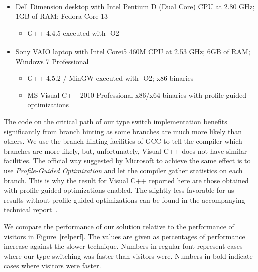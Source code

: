 \begin{itemize}
\setlength{\itemsep}{0pt}
\setlength{\parskip}{0pt}
\item Dell Dimension\textsuperscript{\textregistered} desktop with Intel\textsuperscript{\textregistered} Pentium\textsuperscript{\textregistered} 
      D (Dual Core) CPU at 2.80 GHz; 1GB of RAM; Fedora Core 13  
      \begin{itemize}
      \setlength{\itemsep}{0pt}
      \setlength{\parskip}{0pt}
      \item G++ 4.4.5 executed with -O2
      \end{itemize}
\item Sony VAIO\textsuperscript{\textregistered} laptop with Intel\textsuperscript{\textregistered} Core\texttrademark i5 460M 
      CPU at 2.53 GHz; 6GB of RAM; Windows 7 Professional
      \begin{itemize}
      \setlength{\itemsep}{0pt}
      \setlength{\parskip}{0pt}
      \item G++ 4.5.2 / MinGW executed with -O2; x86 binaries
      \item MS Visual C++ 2010 Professional x86/x64 binaries with profile-guided optimizations
      \end{itemize}
\end{itemize}

\noindent
The code on the critical path of our type switch implementation benefits 
significantly from branch hinting as some branches are much more likely than 
others. We use the branch hinting facilities of GCC to tell the compiler which 
branches are more likely, but, unfortunately, Visual C++ does not have similar 
facilities. The official way suggested by Microsoft to achieve the same effect 
is to use \emph{Profile-Guided Optimization} and let the compiler gather 
statistics on each branch. This is why the result for Visual C++ reported here 
are those obtained with profile-guided optimizations enabled. The slightly 
less-favorable-for-us results without profile-guided optimizations can be found 
in the accompanying technical report~\cite{TR}.

We compare the performance of our solution relative to the performance of visitors in 
Figure~\ref{relperf}. The values are given as percentages of performance increase 
against the slower technique. Numbers in regular font represent cases where our type 
switching was faster than visitors were. Numbers in bold indicate cases where 
visitors were faster.

